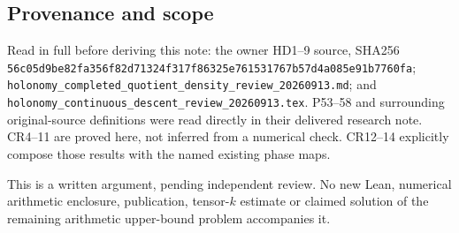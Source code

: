 \subsection{Provenance and scope}\label{provenance-and-scope}

\begingroup\raggedright
Read in full before deriving this note: the owner HD1--9 source, SHA256 \nolinkurl{56c05d9be82fa356f82d71324f317f86325e761531767b57d4a085e91b7760fa}; \nolinkurl{holonomy_completed_quotient_density_review_20260913.md}; and \nolinkurl{holonomy_continuous_descent_review_20260913.tex}. P53--58 and surrounding original-source definitions were read directly in their delivered research note. CR4--11 are proved here, not inferred from a numerical check. CR12--14 explicitly compose those results with the named existing phase maps.

\par\endgroup

This is a written argument, pending independent review. No new Lean, numerical arithmetic enclosure, publication, tensor-\(k\) estimate or claimed solution of the remaining arithmetic upper-bound problem accompanies it.

